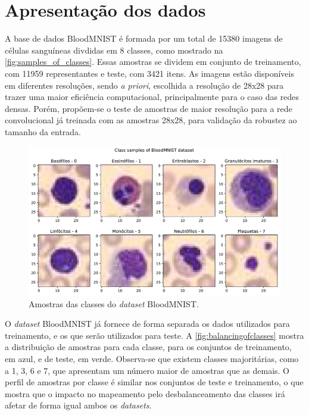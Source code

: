 \section{Apresentação dos dados}

A base de dados BloodMNIST é formada por um total de 15380 imagens de células sanguíneas divdidas em 8 classes, como mostrado na \autoref{fig:samples_of_classes}. Essas amostras se dividem em conjunto de treinamento, com 11959 representantes e teste, com 3421 itens. As imagens estão disponíveis em diferentes resoluções, sendo \textit{a priori}, escolhida a resolução de 28x28 para trazer uma maior eficiência computacional, principalmente para o caso das redes densas. Porém, propõem-se o teste de amostras de maior resolução para a rede convolucional já treinada com as amostras 28x28, para validação da robustez ao tamanho da entrada.

\begin{figure}[H]
	\centering
	\includegraphics[width=0.75\linewidth]{../../plot/samples_of_classes}
	\caption{Amostras das classes do \textit{dataset} BloodMNIST.}
	\label{fig:samples_of_classes}
\end{figure}

O \textit{dataset} BloodMNIST já fornece de forma separada os dados utilizados para treinamento, e os que serão utilizados para teste. A \autoref{fig:balancingofclasses} mostra a distribuição de amostras para cada classe, para os conjuntos de treinamento, em azul, e de teste, em verde. Observa-se que existem classes majoritárias, como a 1, 3, 6 e 7, que apresentam um número maior de amostras que as demais. O perfil de amostras por classe é similar nos conjuntos de teste e treinamento, o que mostra que o impacto no mapeamento pelo desbalanceamento das classes irá afetar de forma igual ambos os \textit{datasets}.

